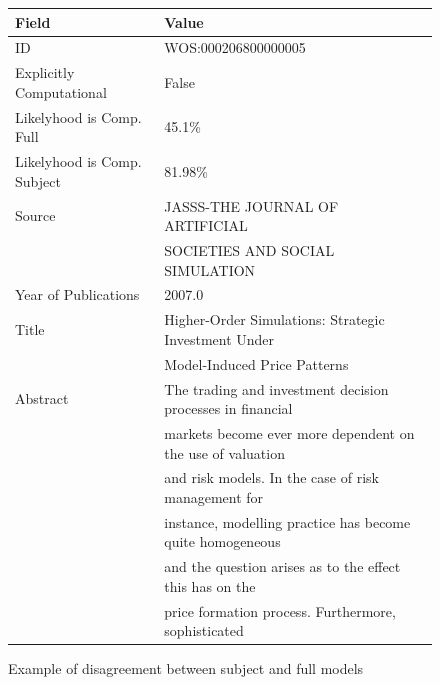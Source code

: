 \documentclass[12pt, a4paper]{article}
\begin{document}
\begin{figure}[H]
	\begin{tabular}{ll}
		\toprule
		Field & Value\\
		\midrule
		ID & WOS:000206800000005 \\
		Explicitly Computational & False \\
		Likelyhood is Comp. Full& 45.1\% \\
		Likelyhood is Comp. Subject& 81.98\% \\
		Source &  JASSS-THE JOURNAL OF ARTIFICIAL\\
		& SOCIETIES AND SOCIAL SIMULATION \\
		Year of Publications & 2007.0 \\
		Title &  Higher-Order Simulations: Strategic Investment Under\\
		&Model-Induced Price Patterns \\
		\midrule
		Abstract &  The trading and investment decision processes in financial\\
		&markets become ever more dependent on the use of valuation\\
		&and risk models. In the case of risk management for\\
		&instance, modelling practice has become quite homogeneous\\
		&and the question arises as to the effect this has on the\\
		&price formation process. Furthermore, sophisticated\\
	\end{tabular}
\caption{Example of disagreement between subject and full models}\label{subTrue}
\end{figure}
\end{document}
